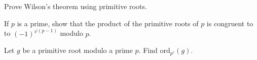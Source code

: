 \documentclass{subfile}
\begin{document}
	\begin{problem}
		Prove Wilson's theorem using primitive roots.
	\end{problem}


	\begin{problem}
		If $p$ is a prime, show that the product of the primitive roots of $p$ is congruent to to $(-1)^{\varphi(p-1)}$ modulo $p$. %
	\end{problem}


	\begin{problem}
		Let $g$ be a primitive root modulo a prime $p$. Find $\text{ord}_{p^r}(g)$. %
	\end{problem}

\end{document}
